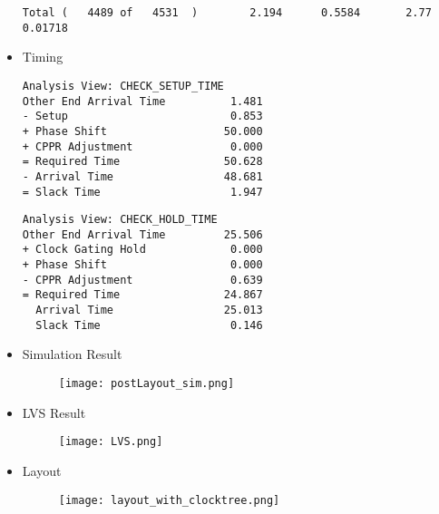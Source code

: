 \documentclass{article}
\begin{document}
\begin{itemize}
\begin{lstlisting}[backgroundcolor = \color{white},basicstyle=\small\sffamily]
Total (   4489 of   4531  )        2.194      0.5584       2.77     0.01718
                \end{lstlisting}
                \item Timing
                \begin{lstlisting}[backgroundcolor = \color{white},basicstyle=\small\sffamily]
Analysis View: CHECK_SETUP_TIME
Other End Arrival Time          1.481
- Setup                         0.853
+ Phase Shift                  50.000
+ CPPR Adjustment               0.000
= Required Time                50.628
- Arrival Time                 48.681
= Slack Time                    1.947
                \end{lstlisting}
                \begin{lstlisting}[backgroundcolor = \color{white},basicstyle=\small\sffamily]
Analysis View: CHECK_HOLD_TIME
Other End Arrival Time         25.506
+ Clock Gating Hold             0.000
+ Phase Shift                   0.000
- CPPR Adjustment               0.639
= Required Time                24.867
  Arrival Time                 25.013
  Slack Time                    0.146
                \end{lstlisting}
                \item Simulation Result
                \begin{figure}[h]
                    \texttt{[image: postLayout\_sim.png]}
                \end{figure}
                \item LVS Result
                \begin{figure}[h]
                    \texttt{[image: LVS.png]}
                \end{figure}
                \item Layout
                \begin{figure}[h]
                    \texttt{[image: layout\_with\_clocktree.png]}
                    \centering
                \end{figure}
            \end{itemize}
\end{document}
